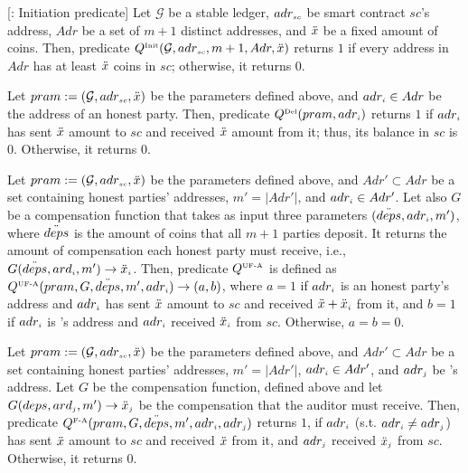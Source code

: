 
 
 \begin{definition}
  [\qinit: Initiation predicate] Let $\mathcal{G}$ be a stable ledger, $adr_{\scriptscriptstyle sc}$ be smart contract $sc$'s address, $Adr$ be a set of $m+1$ distinct addresses, and $\ddot{x}$ be a fixed amount of coins. Then, predicate $Q^{\scriptscriptstyle \text{Init}}(\mathcal{G}, adr_{\scriptscriptstyle sc}, m+1, Adr, \ddot{x})$ returns $1$ if every address in $Adr$ has at least $\ddot{x}$ coins in $sc$; otherwise, it returns $0$. 
 \end{definition}

 
 
    \begin{definition}   Let $pram:=(\mathcal{G}, adr_{\scriptscriptstyle sc}, \ddot{x})$ be the parameters defined above, and   $adr_{\scriptscriptstyle i}\in Adr$ be the address of an honest party. 
    Then, predicate $Q^{\scriptscriptstyle \text{Del}}(pram, adr_{\scriptscriptstyle i})$ returns $1$ if $adr_{\scriptscriptstyle i}$ has sent $\ddot{x}$ amount to $sc$ and received  $\ddot{x}$ amount from it; thus,  its balance in $sc$ is $0$. Otherwise, it returns $0$. 
  \end{definition}
 
 
 
   \begin{definition}  
 Let $pram:=(\mathcal{G}, adr_{\scriptscriptstyle sc}, \ddot{x})$ be the parameters defined above, and $Adr'\subset Adr$ be a set containing honest parties' addresses, $m' = |Adr'|$,  and   $adr_{\scriptscriptstyle i}\in Adr'$. Let also $G$ be a compensation function that takes as input  three parameters $(\ddot{deps}, adr_{\scriptscriptstyle i}, m')$, where $\ddot{deps}$ is the amount of coins  that all $m+1$ parties  deposit. It returns the amount of compensation each honest party must receive, i.e., $G(\ddot{deps}, ard_{\scriptscriptstyle i}, m')\rightarrow \ddot{x}_{\scriptscriptstyle i}$. Then, predicate $Q^{\scriptscriptstyle \text{UF-A}}$ is defined as $Q^{\scriptscriptstyle \text{UF-A}}(pram, G, \ddot{deps}, m', adr_{\scriptscriptstyle i})\rightarrow (a,b)$, where $a=1$ if $adr_{\scriptscriptstyle i}$ is an honest party's address and $adr_{\scriptscriptstyle i}$ has sent $\ddot{x}$ amount to $sc$ and received  $\ddot{x}+\ddot{x}_{\scriptscriptstyle i}$  from it, and $b=1$ if $adr_{\scriptscriptstyle i}$ is \aud's address and $adr_{\scriptscriptstyle i}$ received $\ddot{x}_{\scriptscriptstyle i}$  from $sc$. Otherwise, $a=b=0$. 
  \end{definition}
  
  
\begin{definition}  
 Let $pram:=(\mathcal{G}, adr_{\scriptscriptstyle sc}, \ddot{x})$ be the parameters defined above, and $Adr'\subset Adr$ be a set containing honest parties' addresses, $m' = |Adr'|$,     $adr_{\scriptscriptstyle i}\in Adr'$, and  $adr_{\scriptscriptstyle j}$ be \aud's address. Let $G$ be the compensation function, defined above and let $G(deps, ard_{\scriptscriptstyle j}, m')\rightarrow \ddot{x}_{\scriptscriptstyle j}$ be the compensation that the auditor must receive.  Then, predicate $Q^{\scriptscriptstyle \text{F-A}}(pram, G, \ddot{deps}, m', adr_{\scriptscriptstyle i}, adr_{\scriptscriptstyle j})$ returns $1$, if $adr_{\scriptscriptstyle i}$ (s.t. $adr_{\scriptscriptstyle i}\neq adr_{\scriptscriptstyle j}$) has sent $\ddot{x}$ amount to $sc$ and received  $\ddot{x}$  from it, and $adr_{\scriptscriptstyle j}$ received $\ddot{x}_{\scriptscriptstyle j}$  from $sc$. Otherwise, it returns $0$. 
 \end{definition}
  
